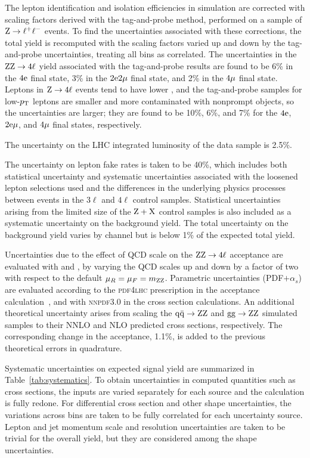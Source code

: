 The lepton identification and isolation efficiencies in simulation are corrected with scaling factors derived with the tag-and-probe method, performed on a sample of $\mathrm{Z} \to \ell^+\ell^-$ events.
To find the uncertainties associated with these corrections, the total yield is recomputed with the scaling factors varied up and down by the tag-and-probe uncertainties, treating all bins as correlated.
The uncertainties in the $\mathrm{Z}\mathrm{Z} \to 4\ell$ yield associated with the tag-and-probe results are found to be 6\% in the $4\mathrm{e}$ final state, 3\% in the $2\mathrm{e}2\mathrm{\mu}$ final state, and 2\% in the $4\mathrm{\mu}$ final state.
Leptons in $\mathrm{Z} \to 4\ell$ events tend to have lower {\pt}, and the tag-and-probe samples for low-$p_\mathrm{T}$ leptons are smaller and more contaminated with nonprompt objects, so the uncertainties are larger; they are found to be 10\%, 6\%, and 7\% for the $4\mathrm{e}$, $2\mathrm{e}\mathrm{\mu}$, and $4\mathrm{\mu}$ final states, respectively.

The uncertainty on the LHC integrated luminosity of the data sample is 2.5\%.

The uncertainty on lepton fake rates is taken to be 40\%, which includes both statistical uncertainty and systematic uncertainties associated with the loosened lepton selections used and the differences in the underlying physics processes between events in the $3\ell$ and $4\ell$ control samples.
Statistical uncertainties arising from the limited size of the $\mathrm{Z}+\mathrm{X}$ control samples is also included as a systematic uncertainty on the background yield.
The total uncertainty on the background yield varies by channel but is below 1\% of the expected total yield.

Uncertainties due to the effect of QCD scale on the $\mathrm{Z}\mathrm{Z} \to 4\ell$ acceptance are evaluated with {\POWHEG} and {\MCFM}, by varying the QCD scales up and down by a factor of two with respect to the default $\mu_R = \mu_F = m_{\mathrm{Z}\mathrm{Z}}$.
Parametric  uncertainties (PDF$+ \alpha_s$) are evaluated according to the \textsc{pdf4lhc} prescription in the acceptance calculation~\cite{Butterworth:2015oua}, and with \textsc{nnpdf3.0} in the cross section calculations.
An additional theoretical uncertainty arises from scaling the $\mathrm{q}\bar{\mathrm{q}} \to \mathrm{Z}\mathrm{Z}$ and $\mathrm{g}\mathrm{g} \to \mathrm{Z}\mathrm{Z}$ simulated samples to their NNLO and NLO predicted cross sections, respectively.
The corresponding change in the acceptance, 1.1\%, is added to the previous theoretical errors in quadrature.

Systematic uncertainties on expected signal yield are summarized in Table~\ref{tab:systematics}.
To obtain uncertainties in computed quantities such as cross sections, the inputs are varied separately for each source and the calculation is fully redone.
For differential cross section and other shape uncertainties, the variations across bins are taken to be fully correlated for each uncertainty source.
Lepton and jet momentum scale and resolution uncertainties are taken to be trivial for the overall yield, but they are considered among the shape uncertainties.

